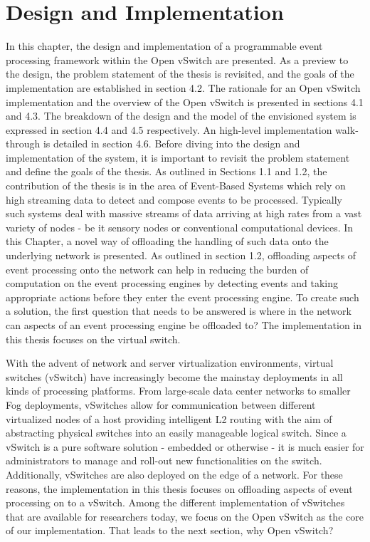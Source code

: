\chapter{Design and Implementation}
In this chapter, the design and implementation of a programmable event processing framework within the Open vSwitch are presented. As a preview to the design, the problem statement of the thesis is revisited, and the goals of the implementation are established in section 4.2. The rationale for an Open vSwitch implementation and the overview of the Open vSwitch is presented in sections 4.1 and 4.3. The breakdown of the design and the model of the envisioned system is expressed in section 4.4 and 4.5 respectively. An high-level implementation walk-through is detailed in section 4.6.
Before diving into the design and implementation of the system, it is important to revisit the problem statement and define the goals of the thesis. As outlined in Sections 1.1 and 1.2, the contribution of the thesis is in the area of Event-Based Systems which rely on high streaming data to detect and compose events to be processed. Typically such systems deal with massive streams of data arriving at high rates from a vast variety of nodes - be it sensory nodes or conventional computational devices. In this Chapter, a novel way of offloading the handling of such data onto the underlying network is presented. As outlined in section 1.2, offloading aspects of event processing onto the network can help in reducing the burden of computation on the event processing engines by detecting events and taking appropriate actions before they enter the event processing engine. To create such a solution, the first question that needs to be answered is where in the network can aspects of an event processing engine be offloaded to? The implementation in this thesis focuses on the virtual switch.

With the advent of network and server virtualization environments, virtual switches (vSwitch) have increasingly become the mainstay deployments in all kinds of processing platforms. From large-scale data center networks to smaller Fog deployments, vSwitches allow for communication between different virtualized nodes of a host providing intelligent L2 routing with the aim of abstracting physical switches into an easily manageable logical switch. Since a vSwitch is a pure software solution - embedded or otherwise - it is much easier for administrators to manage and roll-out new functionalities on the switch. Additionally, vSwitches are also deployed on the edge of a network. For these reasons, the implementation in this thesis focuses on offloading aspects of event processing on to a vSwitch. Among the different implementation of vSwitches that are available for researchers today, we focus on the Open vSwitch as the core of our implementation. That leads to the next section, why Open vSwitch? 


